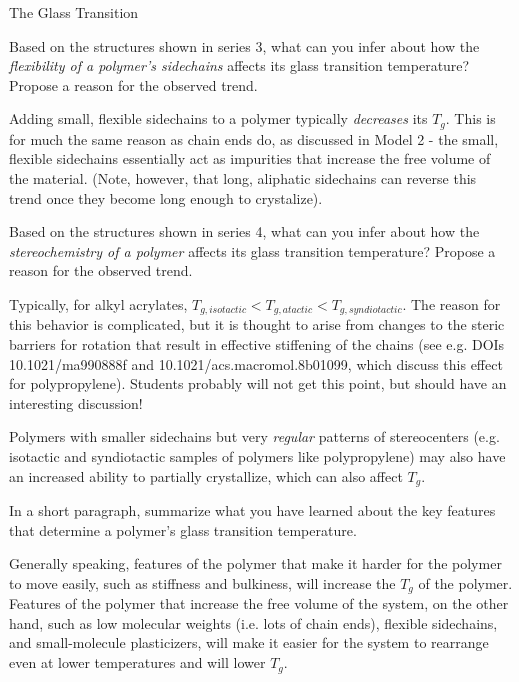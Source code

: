 \begin{activity}{The Glass Transition}
\begin{ctqs}
	\question Based on the structures shown in series 3, what can you infer about how the \emph{flexibility of a polymer's sidechains} affects its glass transition temperature?  Propose a reason for the observed trend.
	
		\begin{solution}[0.75in]
			Adding small, flexible sidechains to a polymer typically \emph{decreases} its $T_g$.  This is for much the same reason as chain ends do, as discussed in Model 2 - the small, flexible sidechains essentially act as impurities that increase the free volume of the material.  (Note, however, that long, aliphatic sidechains can reverse this trend once they become long enough to crystalize).
		\end{solution}
		
	\question Based on the structures shown in series 4, what can you infer about how the \emph{stereochemistry of a polymer} affects its glass transition temperature?  Propose a reason for the observed trend.
	
		\begin{solution}[1in]
			Typically, for alkyl acrylates, $T_{g,isotactic}<T_{g,atactic}<T_{g,syndiotactic}$.  The reason for this behavior is complicated, but it is thought to arise from changes to the steric barriers for rotation that result in effective stiffening of the chains (see e.g. DOIs 10.1021/ma990888f and 10.1021/acs.macromol.8b01099, which discuss this effect for polypropylene).  Students probably will not get this point, but should have an interesting discussion!
			
			Polymers with smaller sidechains but very \emph{regular} patterns of stereocenters (e.g. isotactic and syndiotactic samples of polymers like polypropylene) may also have an increased ability to partially crystallize, which can also affect $T_g$.
		\end{solution}
	
	\question In a short paragraph, summarize what you have learned about the key features that determine a polymer's glass transition temperature.
	
		\begin{solution}[2in]
			Generally speaking, features of the polymer that make it harder for the polymer to move easily, such as stiffness and bulkiness, will increase the $T_g$ of the polymer.  Features of the polymer that increase the free volume of the system, on the other hand, such as low molecular weights (i.e. lots of chain ends), flexible sidechains, and small-molecule plasticizers, will make it easier for the system to rearrange even at lower temperatures and will lower $T_g$.
		\end{solution}
	

\end{ctqs}
\end{activity}
